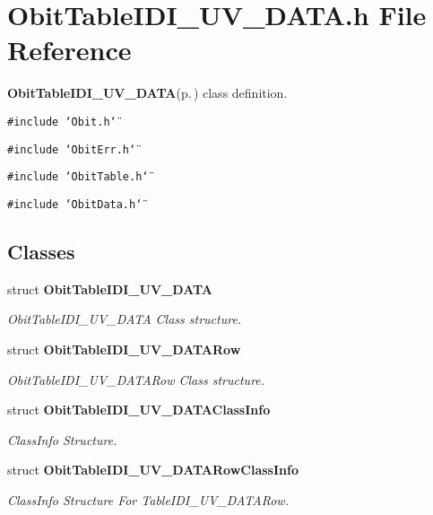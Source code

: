 \section{Obit\-Table\-IDI\_\-UV\_\-DATA.h File Reference}
\label{ObitTableIDI__UV__DATA_8h}
{\bf Obit\-Table\-IDI\_\-UV\_\-DATA}{\rm (p.\,\pageref{structObitTableIDI__UV__DATA})} class definition. 

{\tt \#include \char`\"{}Obit.h\char`\"{}}\par
{\tt \#include \char`\"{}Obit\-Err.h\char`\"{}}\par
{\tt \#include \char`\"{}Obit\-Table.h\char`\"{}}\par
{\tt \#include \char`\"{}Obit\-Data.h\char`\"{}}\par
\subsection*{Classes}
\begin{CompactItemize}
\item 
struct {\bf Obit\-Table\-IDI\_\-UV\_\-DATA}
\begin{CompactList}\small\item\em Obit\-Table\-IDI\_\-UV\_\-DATA Class structure. \item\end{CompactList}\item 
struct {\bf Obit\-Table\-IDI\_\-UV\_\-DATARow}
\begin{CompactList}\small\item\em Obit\-Table\-IDI\_\-UV\_\-DATARow Class structure. \item\end{CompactList}\item 
struct {\bf Obit\-Table\-IDI\_\-UV\_\-DATAClass\-Info}
\begin{CompactList}\small\item\em Class\-Info Structure. \item\end{CompactList}\item 
struct {\bf Obit\-Table\-IDI\_\-UV\_\-DATARow\-Class\-Info}
\begin{CompactList}\small\item\em Class\-Info Structure For Table\-IDI\_\-UV\_\-DATARow. \item\end{CompactList}\end{CompactItemize}
